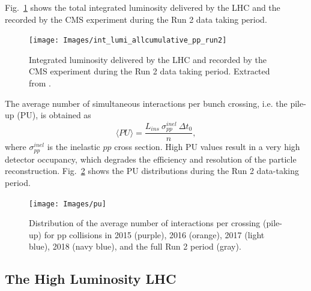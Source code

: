 \documentclass[../main.tex]{subfiles}
\begin{document}
Fig.~\ref{intro:fig:lumi_int} shows the total integrated luminosity delivered by the LHC and the recorded by the CMS experiment during the Run 2 data taking period.

\begin{figure}[h!]
\begin{center}
\texttt{[image: Images/int\_lumi\_allcumulative\_pp\_run2]}
\end{center}
\caption[Integrated luminosity during Run 2]{Integrated luminosity delivered by the LHC and recorded by the CMS experiment during the Run 2 data taking period. Extracted from \cite{intro:exp:cms_lumi}.}
\label{intro:fig:lumi_int}
\end{figure}



The average number of simultaneous interactions per bunch crossing, i.e. the pile-up (PU), is obtained as
\begin{equation}
\langle PU \rangle = \frac{L_{ins}~\sigma_{pp}^{inel}~\Delta t_0}{n},
\end{equation}
where $\sigma_{pp}^{inel}$ is the inelastic $pp$ cross section. High PU values result in a very high detector occupancy, which degrades the efficiency and resolution of the particle reconstruction. Fig.~\ref{intro:fig:pu} shows the PU distributions during the Run 2 data-taking period. 

\begin{figure}[h!]
\begin{center}
\texttt{[image: Images/pu]}
\end{center}
\caption[Run 2 pile-up distribution]{Distribution of the average number of interactions per crossing (pile-up) for pp collisions in 2015 (purple), 2016 (orange), 2017 (light blue), 2018 (navy blue), and the full Run 2 period (gray).}
\label{intro:fig:pu}
\end{figure}



\subsection{The High Luminosity LHC}
\label{intro:sec:hllhc}
\end{document}
